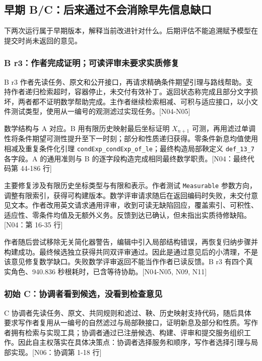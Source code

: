 \subsection[早期 B/C：后来通过不会消除早先信息缺口]{\texorpdfstring{\protect\hypertarget{g9}{}早期 B/C：后来通过不会消除早先信息缺口}{早期 B/C：后来通过不会消除早先信息缺口}}
下两次运行属于早期版本，解释当前改进针对什么。后期评估不能追溯赋予模型在提交时尚未返回的意见。

\subsubsection[B r3：作者完成证明；可读评审未要求实质修复]{\texorpdfstring{\protect\hypertarget{g9-1}{}B r3：作者完成证明；可读评审未要求实质修复}{B r3：作者完成证明；可读评审未要求实质修复}}
B r3 作者先读任务、原文和公开接口，再请求精确条件期望引理与路线帮助。支持作者递归检索超时，容器停止，未交付有效补丁。返回状态称完成且部分文字损坏，两者都不证明数学帮助完成。主作者继续检索相减、可积与适应接口，以小文件测试类型，使用从一编号的观测滤过实现任务。[N04-N05]

数学结构与 A 对应。B 用有限历史映射最后坐标证明 $X_{n+1}$ 可测，再用滤过单调性将条件期望可测性提升至下一时刻；部分和性质递归获得。零条件新息均值使用相减及重复条件化引理 \nolinkurl{condExp_condExp_of_le}；最终构造局部鞅定义 \nolinkurl{def_13_7} 各字段。A 的通用准则与 B 的逐字段构造完成相同最终数学职责。[N04：最终代码第 44-186 行]

主要修复涉及有限历史坐标类型与有限和表示。作者测试 \nolinkurl{Measurable} 参数方向，调整有限索引，获得可构建版本。数学评审请求随后在返回编码时失败，未交付意见文本。作者改用英文请求通用评审，收到可读无缺陷回应，覆盖索引、可积性、适应性、零条件均值及无额外义务。反馈到达已确认，但未指出实质待修缺陷。[N04：第 16-35 行]

作者随后尝试移除无关简化器警告，编辑中引入局部结构错误，再恢复归纳步骤并构建成功。最终候选独立获得共同双评审通过。因此是通过意见后的小清理，不是该意见修复数学缺口。失败数学评审返回不能当作作者已读反馈。B r3 有四个真实角色、940.836 秒根耗时，已含等待协助。[N04-N05, N09, N11]

\subsubsection[初始 C：协调者看到候选，没看到检查意见]{\texorpdfstring{\protect\hypertarget{g9-2}{}初始 C：协调者看到候选，没看到检查意见}{初始 C：协调者看到候选，没看到检查意见}}
C 协调者先读任务、原文、共同规则和滤过、鞅、历史映射支持代码，随后具体要求写作者复用从一编号的自然滤过与局部鞅接口，证明新息及部分和性质。写作者拥有检索与实现工具；协调者通过已注册候选、构建、评审和提交服务组织工作。因此自主权落实在具体决策点：协调者选择服务和顺序，写作者选择引理与局部实现。[N06：协调第 1-18 行]

